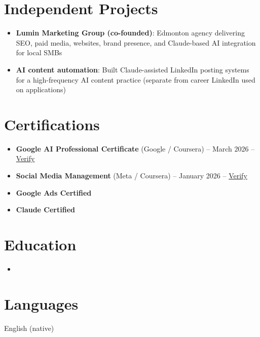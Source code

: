 \documentclass[11pt,a4paper,sans]{moderncv}
\begin{document}
\section{Independent Projects}
\vspace{1pt}
\begin{itemize}
\item \textbf{Lumin Marketing Group (co-founded)}: Edmonton agency delivering SEO, paid media, websites, brand presence, and Claude-based AI integration for local SMBs
\item \textbf{AI content automation}: Built Claude-assisted LinkedIn posting systems for a high-frequency AI content practice (separate from career LinkedIn used on applications)
\end{itemize}

\section{Certifications}
\vspace{1pt}
\begin{itemize}
\item \textbf{Google AI Professional Certificate} (Google / Coursera) -- March 2026 -- \href{https://www.coursera.org/account/accomplishments/verify/professional-cert/54E1P3RBHVL8}{Verify}
\item \textbf{Social Media Management} (Meta / Coursera) -- January 2026 -- \href{https://www.coursera.org/account/accomplishments/verify/7NOVGMU2L69G}{Verify}
\item \textbf{Google Ads Certified}
\item \textbf{Claude Certified}
\end{itemize}

\section{Education}
\vspace{1pt}
\begin{itemize}
\item{}
\end{itemize}

\section{Languages}
\vspace{1pt}
English (native)
\end{document}
